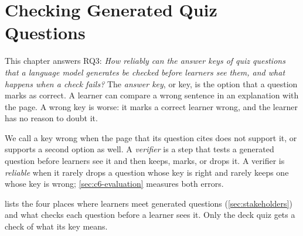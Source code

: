\chapter{Checking Generated Quiz Questions}
\label{ch:trust}

This chapter answers RQ3: \emph{How reliably can the answer keys of quiz
questions that a language model generates be checked before learners see
them, and what happens when a check fails?} The \emph{answer key}, or key, is
the option that a question marks as correct. A learner can compare a wrong
sentence in an explanation with the page. A wrong key is worse: it marks a
correct learner wrong, and the learner has no reason to doubt it.

We call a key wrong when the page that its question cites does not support
it, or supports a second option as well. A \emph{verifier} is a step that
tests a generated question before learners see it and then keeps, marks, or
drops it. A verifier is \emph{reliable} when it rarely drops a question whose
key is right and rarely keeps one whose key is wrong; \cref{sec:c6-evaluation}
measures both errors.

 lists the four places where learners meet generated
questions (\cref{sec:stakeholders}) and what checks each question before a
learner sees it. Only the deck quiz gets a check of what its key means.

